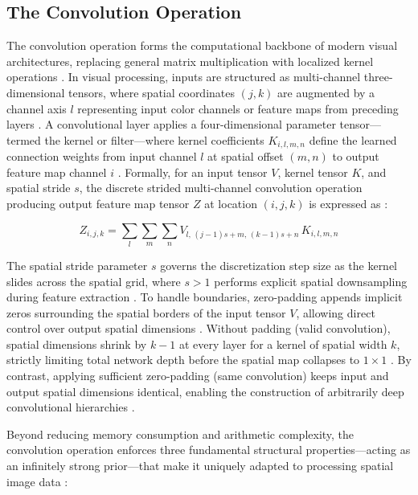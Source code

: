 \subsection{The Convolution Operation}

The convolution operation forms the computational backbone of modern visual architectures, replacing general matrix multiplication with localized kernel operations \parencite{Goodfellow-et-al-2016}. In visual processing, inputs are structured as multi-channel three-dimensional tensors, where spatial coordinates $(j,k)$ are augmented by a channel axis $l$ representing input color channels or feature maps from preceding layers \parencite{Goodfellow-et-al-2016}. A convolutional layer applies a four-dimensional parameter tensor---termed the kernel or filter---where kernel coefficients $K_{i,l,m,n}$ define the learned connection weights from input channel $l$ at spatial offset $(m,n)$ to output feature map channel $i$ \parencite{Goodfellow-et-al-2016}. Formally, for an input tensor $V$, kernel tensor $K$, and spatial stride $s$, the discrete strided multi-channel convolution operation producing output feature map tensor $Z$ at location $(i,j,k)$ is expressed as \parencite{Goodfellow-et-al-2016}:

\begin{equation}
Z_{i,j,k} = \sum_{l} \sum_{m} \sum_{n} V_{l,\,(j-1)s+m,\,(k-1)s+n} \, K_{i,l,m,n}
\label{eq:conv}
\end{equation}

The spatial stride parameter $s$ governs the discretization step size as the kernel slides across the spatial grid, where $s > 1$ performs explicit spatial downsampling during feature extraction \parencite{Goodfellow-et-al-2016}. To handle boundaries, zero-padding appends implicit zeros surrounding the spatial borders of the input tensor $V$, allowing direct control over output spatial dimensions \parencite{Goodfellow-et-al-2016}. Without padding (valid convolution), spatial dimensions shrink by $k-1$ at every layer for a kernel of spatial width $k$, strictly limiting total network depth before the spatial map collapses to $1 \times 1$ \parencite{Goodfellow-et-al-2016}. By contrast, applying sufficient zero-padding (same convolution) keeps input and output spatial dimensions identical, enabling the construction of arbitrarily deep convolutional hierarchies \parencite{Goodfellow-et-al-2016}.

Beyond reducing memory consumption and arithmetic complexity, the convolution operation enforces three fundamental structural properties---acting as an infinitely strong prior---that make it uniquely adapted to processing spatial image data \parencite{Goodfellow-et-al-2016}:

